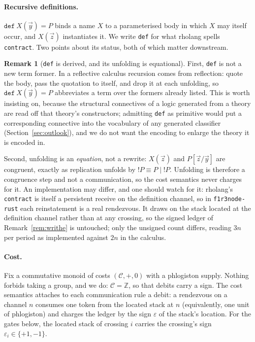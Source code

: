 \documentclass[11pt]{article}
\theoremstyle{definition}
\newtheorem{remark}{Remark}
\begin{document}
\paragraph{Recursive definitions.}
$\mathtt{def}\ X(\vec y)=P$ binds a name $X$ to a parameterised body in which $X$
may itself occur, and $X(\vec z)$ instantiates it. We write \texttt{def} for what
rholang spells \texttt{contract}. Two points about its status, both of which
matter downstream.

\begin{remark}[\texttt{def} is derived, and its unfolding is equational]\label{rem:def}
First, \texttt{def} is not a new term former. In a reflective calculus recursion
comes from reflection: quote the body, pass the quotation to itself, and drop it
at each unfolding, so $\mathtt{def}\ X(\vec y)=P$ abbreviates a term over the
formers already listed. This is worth insisting on, because the structural
connectives of a logic generated from a theory are read off that theory's
constructors; admitting \texttt{def} as primitive would put a corresponding
connective into the vocabulary of any generated classifier
(Section~\ref{sec:outlook}), and we do not want the encoding to enlarge the
theory it is encoded in.

Second, unfolding is an \emph{equation}, not a rewrite: $X(\vec z)$ and
$P[\vec z/\vec y]$ are congruent, exactly as replication unfolds by
$!P \equiv P \mid !P$. Unfolding is therefore a congruence step and not a
communication, so the cost semantics never charges for it. An implementation may
differ, and one should watch for it: rholang's \texttt{contract} is itself a
persistent receive on the definition channel, so in \texttt{f1r3node-rust} each
reinstatement is a real rendezvous. It draws on the stack located at the
definition channel rather than at any crossing, so the signed ledger of
Remark~\ref{rem:writhe} is untouched; only the unsigned count differs, reading
$3n$ per period as implemented against $2n$ in the calculus.
\end{remark}

\paragraph{Cost.}
Fix a commutative monoid of costs $(\mathcal{C},+,0)$ with a phlogiston supply.
Nothing forbids taking a group, and we do: $\mathcal{C}=\mathbb{Z}$, so that
debits carry a sign. The cost semantics attaches to each communication rule a
debit: a rendezvous on a channel $n$ consumes one token from the located stack at
$n$ (equivalently, one unit of phlogiston) and charges the ledger by the sign
$\varepsilon$ of the stack's location. For the gates below, the located stack of
crossing $i$ carries the crossing's sign $\varepsilon_i\in\{+1,-1\}$.
\end{document}
